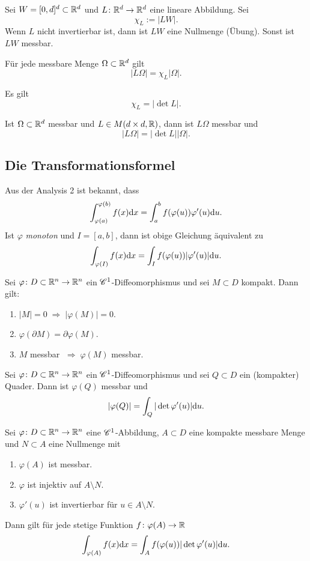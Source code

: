 Sei $W = [0,d]^d \subset \mathbb{R}^d$ und $L \colon \mathbb{R}^d \to \mathbb{R}^d$ eine lineare Abbildung. Sei 
\[\chi_L := |LW|.\]
Wenn $L$ nicht invertierbar ist, dann ist $LW$ eine Nullmenge (Übung). Sonst ist $LW$ messbar.
\begin{satz}\label{satz2_19}
	Für jede messbare Menge $\Omega \subset \mathbb{R}^d$ gilt 
	\[|L\Omega| = \chi_L |\Omega|.\]
\end{satz}
\begin{satz}\label{satz2_20}
	Es gilt
	\[\chi_L = |\det L|.\]
\end{satz}
\begin{thm}\label{thm2_21}
	Ist $\Omega \subset \mathbb{R}^d$ messbar und $L \in M(d \times d, \mathbb{R})$, dann ist $L\Omega$ messbar und 
	\[|L\Omega| = |\det L| |\Omega|.\]	
\end{thm}

\subsection{Die Transformationsformel}
Aus der Analysis 2 ist bekannt, dass
\[\int_{\varphi(a)}^{\varphi(b)} f(x) \mathrm{d} x = \int_a^b f(\varphi(u)) \varphi'(u) \mathrm{d} u.\]
Ist $\varphi$ \textit{monoton} und $I = [a,b]$, dann ist obige Gleichung äquivalent zu
\begin{equation}
	\int_{\varphi(I)} f(x) \mathrm{d} x = \int_I f(\varphi(u)) |\varphi'(u)| \mathrm{d} u.
\end{equation}
\begin{lem}\label{lem2_22}
	Sei $\varphi \colon D \subset \mathbb{R}^n \to \mathbb{R}^n$ ein $\mathscr{C}^1$-Diffeomorphismus und sei $M \subset D$ kompakt. Dann gilt:
	\begin{enumerate}[label=(\alph*)]
		\item $|M| = 0 \;\Rightarrow\; |\varphi(M)| = 0$.
		\item $\varphi(\partial M) = \partial\varphi(M)$.
		\item $M$ messbar $\;\Rightarrow\; \varphi(M)$ messbar.
	\end{enumerate}
\end{lem}
\begin{satz}\label{satz2_23}
	Sei $\varphi \colon D \subset \mathbb{R}^n \to \mathbb{R}^n$ ein $\mathscr{C}^1$-Diffeomorphismus und sei $Q \subset D$ ein (kompakter) Quader. Dann ist $\varphi(Q)$ messbar und 
	\[|\varphi(Q)| = \int_Q |\det\varphi'(u)| \mathrm{d} u.\]
\end{satz}
\begin{thm}\label{satz2_24}
	Sei $\varphi \colon D \subset \mathbb{R}^n \to \mathbb{R}^n$ eine $\mathscr{C}^1$-Abbildung, $A \subset D$ eine kompakte messbare Menge und $N \subset A$ eine Nullmenge mit
	\begin{enumerate}[label=(\alph*)]
		\item $\varphi(A)$ ist messbar.
		\item $\varphi$ ist injektiv auf $A \setminus N$.\label{trafo_b}
		\item $\varphi'(u)$ ist invertierbar für $u \in A \setminus N$. \label{trafo_c}
	\end{enumerate}
	Dann gilt für jede stetige Funktion $f \colon \varphi(A) \to \mathbb{R}$
	\[\int_{\varphi(A)} f(x) \mathrm{d} x = \int_A f(\varphi(u)) |\det \varphi'(u)| \mathrm{d} u.\]
\end{thm}
